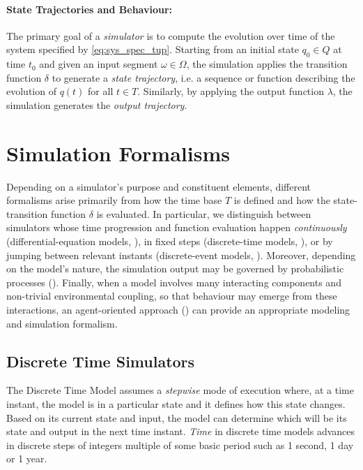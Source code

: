\paragraph{State Trajectories and Behaviour:}\label{par:state_trajectories} The
primary goal of a \emph{simulator} is to compute the evolution over time of the
system specified by \eqref{eq:sys_spec_tup}. Starting from an initial state
$q_0 \in Q$ at time $t_0$ and given an input segment $\omega \in \Omega$, the
simulation applies the transition function $\delta$ to generate a \emph{state
	trajectory}, i.e. a sequence or function describing the evolution of $q(t)$ for
all $t \in T$. Similarly, by applying the output function $\lambda$, the
simulation generates the \emph{output trajectory}.

\section{Simulation Formalisms}

Depending on a simulator's purpose and constituent elements, different
formalisms arise primarily from how the time base $T$ is defined and how the
state-transition function $\delta$ is evaluated. In particular, we distinguish
between simulators whose time progression and function evaluation happen
\emph{continuously} (differential-equation models, ), in fixed
steps (discrete-time models, ), or by jumping between relevant
instants (discrete-event models, ). Moreover, depending on the
model's nature, the simulation output may be governed by probabilistic
processes (). Finally, when a model involves many
interacting components and non-trivial environmental coupling, so that
behaviour may emerge from these interactions, an agent-oriented approach
() can provide an appropriate modeling and simulation
formalism.

\subsection{Discrete Time Simulators}\label{ssec:dts}

The Discrete Time Model assumes a \emph{stepwise} mode of execution where, at a
time instant, the model is in a particular state and it defines how this state
changes. Based on its current state and input, the model can determine which
will be its state and output in the next time instant. \emph{Time} in discrete
time models advances in discrete steps of integers multiple of some basic
period such as 1 second, 1 day or 1 year.


